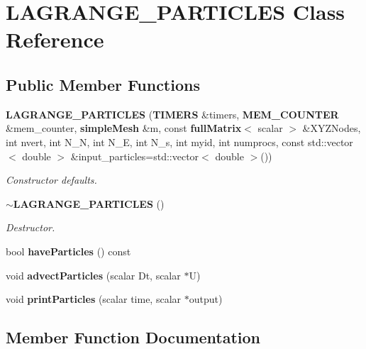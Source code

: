 \section{L\-A\-G\-R\-A\-N\-G\-E\-\_\-\-P\-A\-R\-T\-I\-C\-L\-E\-S Class Reference}
\label{classLAGRANGE__PARTICLES}
\subsection*{Public Member Functions}
\begin{DoxyCompactItemize}
\item 
{\bf L\-A\-G\-R\-A\-N\-G\-E\-\_\-\-P\-A\-R\-T\-I\-C\-L\-E\-S} ({\bf T\-I\-M\-E\-R\-S} \&timers, {\bf M\-E\-M\-\_\-\-C\-O\-U\-N\-T\-E\-R} \&mem\-\_\-counter, {\bf simple\-Mesh} \&m, const {\bf full\-Matrix}$<$ scalar $>$ \&X\-Y\-Z\-Nodes, int nvert, int N\-\_\-\-N, int N\-\_\-\-E, int N\-\_\-s, int myid, int numprocs, const std\-::vector$<$ double $>$ \&input\-\_\-particles=std\-::vector$<$ double $>$())\label{classLAGRANGE__PARTICLES_a84a40617db2e6b6001e19e0330799623}

\begin{DoxyCompactList}\small\item\em Constructor defaults. \end{DoxyCompactList}\item 
{\bf $\sim$\-L\-A\-G\-R\-A\-N\-G\-E\-\_\-\-P\-A\-R\-T\-I\-C\-L\-E\-S} ()\label{classLAGRANGE__PARTICLES_a9533e83a44876aa91e27688d6098ee8d}

\begin{DoxyCompactList}\small\item\em Destructor. \end{DoxyCompactList}\item 
bool {\bf have\-Particles} () const 
\item 
void {\bf advect\-Particles} (scalar Dt, scalar $\ast$U)
\item 
void {\bf print\-Particles} (scalar time, scalar $\ast$output)
\end{DoxyCompactItemize}


\subsection{Member Function Documentation}
